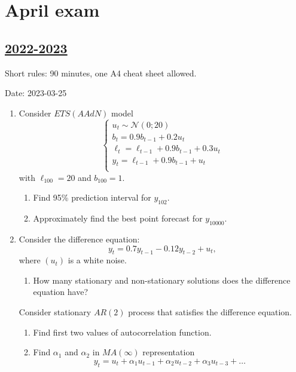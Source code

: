 
\newpage
\thispagestyle{empty}
\section{April exam}


\subsection[2022-2023]{\hyperref[sec:sol_kr_03_2022_2023]{2022-2023}}
\label{sec:kr_03_2022_2023} %

Short rules: 90 minutes, one A4 cheat sheet allowed. 

Date: 2023-03-25

\begin{enumerate}

    \item Consider $ETS(AAdN)$ model 
    \[
    \begin{cases}
    u_t  \sim \mathcal{N}(0;20) \\
    b_t = 0.9 b_{t-1} + 0.2 u_t \\
    \ell_t = \ell_{t-1} + 0.9 b_{t-1} + 0.3 u_t \\
    y_t = \ell_{t-1} + 0.9 b_{t-1} + u_t \\
    \end{cases}
    \]
    with $\ell_{100} = 20$ and $b_{100} = 1$.
    \begin{enumerate}
        \item Find 95\% prediction interval for $y_{102}$.
        \item Approximately find the best point forecast for $y_{10000}$.
    \end{enumerate}
    
    \item Consider the difference equation:
    \[
    y_t = 0.7y_{t-1} - 0.12 y_{t-2} + u_t,    
    \]
    where $(u_t)$ is a white noise. 
    \begin{enumerate}
        \item How many stationary and non-stationary solutions does the difference equation have?
    \end{enumerate}
    
    Consider stationary $AR(2)$ process that satisfies the difference equation. 
    
    \begin{enumerate}[resume]
        \item Find first two values of autocorrelation function.
        \item Find $\alpha_1$ and $\alpha_2$ in $MA(\infty)$ representation 
    \[
    y_t = u_t + \alpha_1 u_{t-1} + \alpha_2 u_{t-2} + \alpha_3 u_{t-3} + \ldots
    \]
    \end{enumerate}
    

\end{enumerate}
